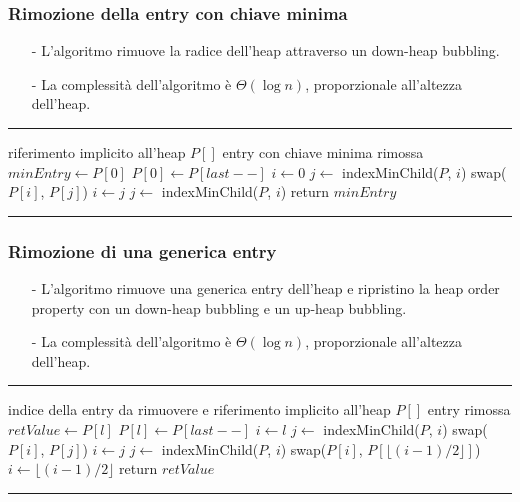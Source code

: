 \documentclass[a4paper]{article}
\makeatletter
\newenvironment{algo}[4]{
	\noindent\rule{\textwidth}{0.4pt}
	\begin{algorithmic}[1]
		\addtocounter{ALG@line}{-1}
		\Procedure{#1}{#2}
		\Require #3
		\Ensure #4
		\Statex }{
		\EndProcedure
	\end{algorithmic}
	\rule{\textwidth}{0.4pt}}
\makeatother
\begin{document}
\subsubsection*{Rimozione della entry con chiave minima}
\begin{itemize}[topsep=3pt, itemsep=0pt]
	\item[-] L'algoritmo rimuove la radice dell'heap attraverso un down-heap bubbling.
	\item[-] La complessità dell'algoritmo è \(\Theta(\log n)\), proporzionale all'altezza dell'heap.
\end{itemize}
\begin{algo}{removemin}{$ $}{riferimento implicito all'heap $P[]$}{entry con chiave minima rimossa}
	\State $minEntry \gets P[0]$
	\State $P[0] \gets P[last--]$
	\State $i \gets 0$
	\State $j \gets$ indexMinChild($P$, $i$)
	 
		\State swap($P[i]$, $P[j]$)
		\State $i \gets j$
		\State $j \gets$ indexMinChild($P$, $i$)
	\EndWhile
	\State return $minEntry$
\end{algo}

\newpage

\subsubsection*{Rimozione di una generica entry}
\begin{itemize}[topsep=3pt, itemsep=0pt]
	\item[-] L'algoritmo rimuove una generica entry dell'heap e ripristino la heap order property con un down-heap bubbling e
	un up-heap bubbling.
	\item[-] La complessità dell'algoritmo è \(\Theta(\log n)\), proporzionale all'altezza dell'heap.
\end{itemize}
\begin{algo}{remove}{$l$}{indice della entry da rimuovere e riferimento implicito all'heap $P[]$}{entry rimossa}
	\State $retValue \gets P[l]$
	\State $P[l] \gets P[last--]$
	\State $i \gets l$
	\State $j \gets$ indexMinChild($P$, $i$)
	 
		\State swap($P[i]$, $P[j]$)
		\State $i \gets j$
		\State $j \gets$ indexMinChild($P$, $i$)
	\EndWhile
	 
		\State swap($P[i]$, $P[\lfloor (i-1)/2\rfloor]$)
		\State $i \gets \lfloor (i-1)/2\rfloor$
	\EndWhile
	\State return $retValue$
\end{algo}
\end{document}

